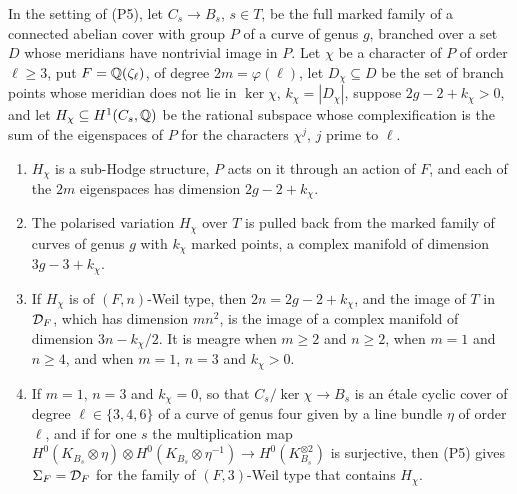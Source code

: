 \begin{proposition}\label{prop:coversreach}
In the setting of \textup{(P5)}, let $C_{s}\to B_{s}$, $s\in T$, be the full
marked family of a connected abelian cover with group $P$ of a curve of
genus $g$, branched over a set $D$ whose meridians have nontrivial image in
$P$. Let $\chi$ be a character of $P$ of order $\ell\ge3$, put
$F=\mathbb{Q}(\zeta_{\ell})$, of degree $2m=\varphi(\ell)$, let $D_{\chi}\subseteq D$
be the set of branch points whose meridian does not lie in $\ker\chi$,
$k_{\chi}=|D_{\chi}|$, suppose $2g-2+k_{\chi}>0$, and let
$H_{\chi}\subseteq H^{1}(C_{s},\mathbb{Q})$ be the rational subspace whose
complexification is the sum of the eigenspaces of $P$ for the characters
$\chi^{j}$, $j$ prime to $\ell$.
\begin{enumerate}[label=\textup{(\roman*)},leftmargin=2.6em,itemsep=2pt]
\item $H_{\chi}$ is a sub-Hodge structure, $P$ acts on it through an action
  of $F$, and each of the $2m$ eigenspaces has dimension $2g-2+k_{\chi}$.
\item The polarised variation $H_{\chi}$ over $T$ is pulled back from the
  marked family of curves of genus $g$ with $k_{\chi}$ marked points, a
  complex manifold of dimension $3g-3+k_{\chi}$.
\item If $H_{\chi}$ is of $(F,n)$-Weil type, then $2n=2g-2+k_{\chi}$, and the
  image of $T$ in $\mathcal{D}_{F}$, which has dimension $mn^{2}$, is the image of a
  complex manifold of dimension $3n-k_{\chi}/2$. It is meagre when $m\ge2$
  and $n\ge2$, when $m=1$ and $n\ge4$, and when $m=1$, $n=3$ and
  $k_{\chi}>0$.
\item If $m=1$, $n=3$ and $k_{\chi}=0$, so that $C_{s}/\ker\chi\to B_{s}$ is
  an \'etale cyclic cover of degree $\ell\in\{3,4,6\}$ of a curve of genus
  four given by a line bundle $\eta$ of order $\ell$, and if for one $s$ the
  multiplication map
  $H^{0}(K_{B_{s}}\otimes\eta)\otimes H^{0}(K_{B_{s}}\otimes\eta^{-1})\to
  H^{0}(K_{B_{s}}^{\otimes2})$ is surjective, then \textup{(P5)} gives
  $\Sigma_{F}=\mathcal{D}_{F}$ for the family of $(F,3)$-Weil type that contains
  $H_{\chi}$.
\end{enumerate}
\end{proposition}

